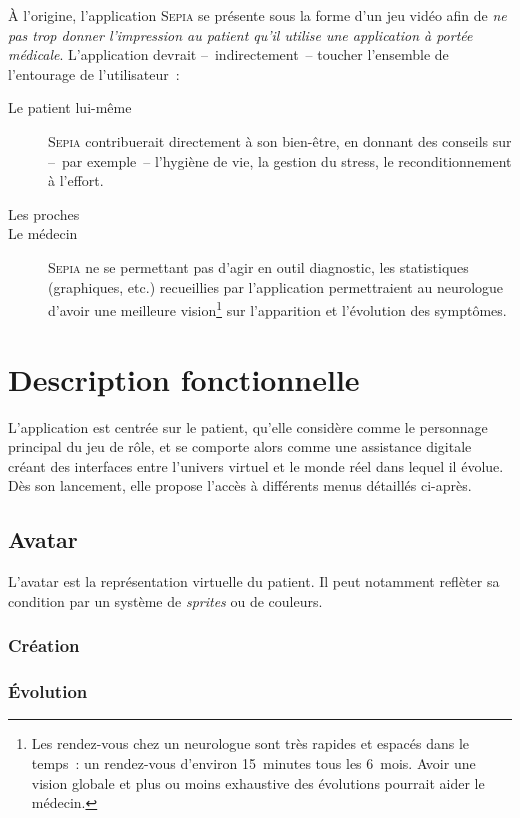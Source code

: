 \documentclass[a4paper,12pt,francais]{article}
\newcommand{\Sepia}{\textsc{Sepia}\xspace}
\begin{document}
À l’origine, l’application \Sepia{} se présente sous la forme d’un jeu vidéo afin de \emph{ne pas trop donner l’impression au patient qu’il utilise une application à portée médicale}. L’application devrait –~indirectement~– toucher l’ensemble de l’entourage de l’utilisateur~:
\begin{description}
    \item[Le patient lui-même] \Sepia{} contribuerait directement à son bien-être, en donnant des conseils sur –~par exemple~– l’hygiène de vie, la gestion du stress, le reconditionnement à l’effort.
    \item[Les proches] %
    \item[Le médecin] \Sepia{} ne se permettant pas d’agir en outil diagnostic, les statistiques (graphiques, etc.) recueillies par l’application permettraient au neurologue d’avoir une meilleure vision\footnote{Les rendez-vous chez un neurologue sont très rapides et espacés dans le temps~: un rendez-vous d’environ 15~minutes tous les 6~mois. Avoir une vision globale et plus ou moins exhaustive des évolutions pourrait aider le médecin.} sur l’apparition et l’évolution des symptômes.
\end{description}

\section{Description fonctionnelle}
L'application est centrée sur le patient, qu'elle considère comme le personnage principal du jeu de rôle, et se comporte alors comme une assistance digitale créant des interfaces entre l'univers virtuel et le monde réel dans lequel il évolue. Dès son lancement, elle propose l'accès à différents menus détaillés ci-après.
\subsection{Avatar}
L'avatar est la représentation virtuelle du patient. Il peut notamment reflèter sa condition par un système de \textit{sprites} ou de couleurs.
\subsubsection{Création}
\subsubsection{Évolution}
\end{document}
